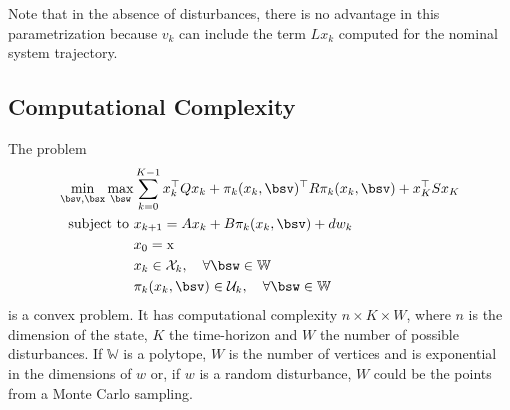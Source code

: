 Note that in the absence of disturbances, there is no advantage in this parametrization because $v_k$ can include the term $Lx_k$ computed for the nominal system trajectory.




\subsection{Computational Complexity}
\label{sec:computational-complexity-rMPC}

The problem
\begin{equation*}
  \begin{aligned}
    \min_{\bsv,\bsx} \max_{\bsw} & \sum_{k=0}^{K-1} x_k^\top Qx_k + \pi_k(x_k,\bsv)^\top R \pi_k(x_k,\bsv) + x_K^\top Sx_K\\
    \text{subject to } & x_{k+1} = Ax_k + B\pi_k(x_k,\bsv) + dw_k \\
                                 & x_0 = \textrm{x} \\
                                 & x_k\in \mathcal{X}_k,\quad \forall \bsw\in \mathbb{W} \\
                                 & \pi_k(x_k,\bsv)\in \mathcal{U}_k,\quad \forall \bsw\in \mathbb{W}
  \end{aligned}
\end{equation*}
is a convex problem. It has computational complexity $n\times K\times W$, where $n$ is the dimension of the state, $K$ the time-horizon and $W$ the number of possible disturbances. If $\mathbb{W}$ is a polytope, $W$ is the number of vertices and is exponential in the dimensions of $w$ or, if $w$ is a random disturbance, $W$ could be the points from a Monte Carlo sampling.


